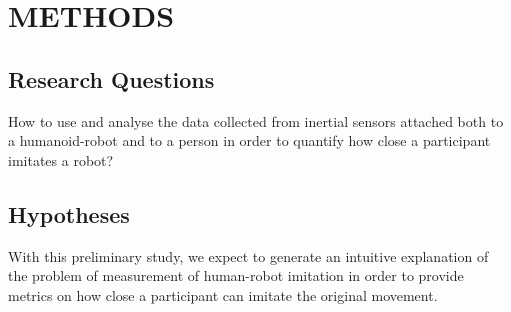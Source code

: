 \documentclass{sig-alternate-05-2015}
\begin{document}










% 
% 
% 







\section{METHODS}

\subsection{Research Questions}

How to use and analyse the data collected from inertial sensors attached both 
to a humanoid-robot and to a person in order to quantify how close a participant 
imitates a robot?


\subsection{Hypotheses}
With this preliminary study, we expect to generate an intuitive 
explanation of the problem of measurement of human-robot imitation 
in order to provide metrics on how close a participant can imitate the original
movement.
\end{document}
